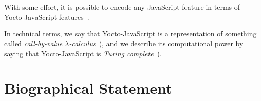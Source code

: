 \documentclass[12pt, oneside]{book}
\begin{document}
With some effort, it is possible to encode any JavaScript feature in terms of Yocto-JavaScript features~\cite[§~6]{understanding-computation}.

In technical terms, we say that Yocto-JavaScript is a representation of something called \emph{call-by-value \(\lambda\)-calculus}~\cite[§~6]{understanding-computation}), and we describe its computational power by saying that Yocto-JavaScript is \emph{Turing complete}~\cite[§~7]{understanding-computation}).


\appendix


\backmatter




\chapter{Biographical Statement}

\end{document}
